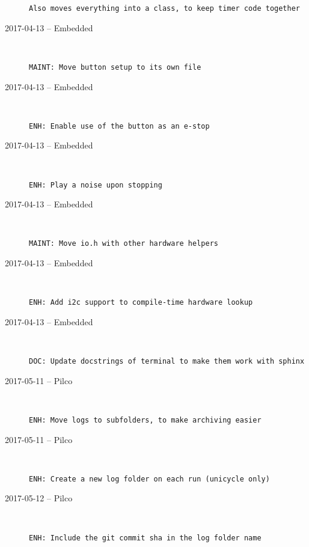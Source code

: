 \begin{description}
\begin{lstlisting}
Also moves everything into a class, to keep timer code together
\end{lstlisting}


  \item[2017-04-13 -- Embedded] \hfill \
\begin{lstlisting}
MAINT: Move button setup to its own file
\end{lstlisting}


  \item[2017-04-13 -- Embedded] \hfill \
\begin{lstlisting}
ENH: Enable use of the button as an e-stop
\end{lstlisting}


  \item[2017-04-13 -- Embedded] \hfill \
\begin{lstlisting}
ENH: Play a noise upon stopping
\end{lstlisting}


  \item[2017-04-13 -- Embedded] \hfill \
\begin{lstlisting}
MAINT: Move io.h with other hardware helpers
\end{lstlisting}


  \item[2017-04-13 -- Embedded] \hfill \
\begin{lstlisting}
ENH: Add i2c support to compile-time hardware lookup
\end{lstlisting}


  \item[2017-04-13 -- Embedded] \hfill \
\begin{lstlisting}
DOC: Update docstrings of terminal to make them work with sphinx
\end{lstlisting}


  \item[2017-05-11 -- Pilco] \hfill \
\begin{lstlisting}
ENH: Move logs to subfolders, to make archiving easier
\end{lstlisting}


  \item[2017-05-11 -- Pilco] \hfill \
\begin{lstlisting}
ENH: Create a new log folder on each run (unicycle only)
\end{lstlisting}


  \item[2017-05-12 -- Pilco] \hfill \
\begin{lstlisting}
ENH: Include the git commit sha in the log folder name
\end{lstlisting}



\end{description}
